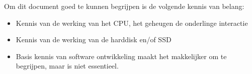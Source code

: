 Om dit document goed te kunnen begrijpen is de volgende kennis van belang:
\begin{itemize}
\item Kennis van de werking van het CPU, het geheugen de onderlinge interactie
\item Kennis van de werking van de harddisk en/of SSD
\item Basis kennis van software ontwikkeling maakt het makkelijker om te begrijpen, maar is niet essentieel.
\end{itemize}
